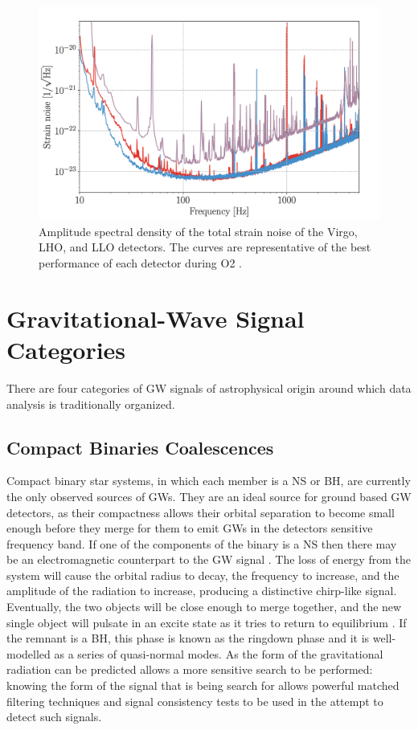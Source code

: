 \documentclass[binding=0.6cm, LaM]{sapthesis}
\begin{document}
        \begin{figure}[t]
          \includegraphics[scale=0.6]{noise1}
          \centering
          \caption{Amplitude spectral density of the total strain noise of the Virgo, LHO, and LLO detectors. The curves are representative of the best performance of each detector during O2 \cite{13}.}
          \label{fig:noise1}
        \end{figure}

\section{Gravitational-Wave Signal Categories}
\label{sec:sources}
	There are four categories of GW signals of astrophysical origin around which data analysis is traditionally organized.

\subsection{Compact Binaries Coalescences}
	Compact binary star systems, in which each member is a NS or BH, 
	are currently the only observed sources of GWs.
	They are an ideal source for ground based GW detectors, 
	as their compactness allows their orbital separation to become 
	small enough before they merge for them to emit GWs in the detectors sensitive frequency band.
	If one of the components of the binary is a NS 
	then there may be an electromagnetic counterpart to the GW signal \cite{20}. 
	The loss of energy from the system will cause the orbital radius to decay, 
	the frequency to increase, and the amplitude of the radiation to increase, 
	producing a distinctive chirp-like signal. 
	Eventually, the two objects will be close enough to merge together, 
	and the new single object will pulsate in an excite state as it tries to return to equilibrium \cite{21}. 
	If the remnant is a BH, this phase is known as the ringdown phase and it is well-modelled as a series of quasi-normal modes. 
	As the form of the gravitational radiation can be predicted allows 
	a more sensitive search to be performed: knowing the form of the signal 
	that is being search for allows powerful matched filtering techniques 
	and signal consistency tests to be used in the attempt to detect such signals.
\end{document}
